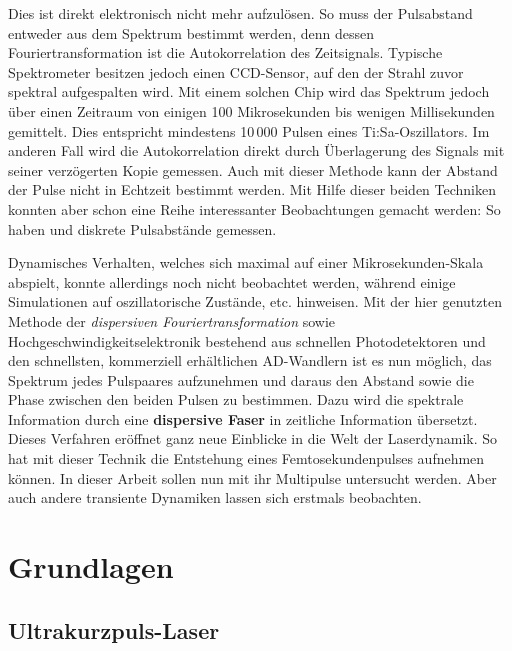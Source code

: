 \documentclass[bachelor,       %
               twoside,        %
               BCOR10mm,       %
               liststotoc,nomtotoc,bibtotoc, %
               english,ngerman, %
               final,          %
               ]{GAUBM}
\begin{document}
Dies ist direkt elektronisch nicht mehr aufzulösen.
So muss der Pulsabstand entweder aus dem Spektrum bestimmt werden, denn dessen Fouriertransformation ist die Autokorrelation des Zeitsignals.
Typische Spektrometer besitzen jedoch einen CCD-Sensor, auf den der Strahl zuvor spektral aufgespalten wird.
Mit einem solchen Chip wird das Spektrum jedoch über einen Zeitraum von einigen 100 Mikrosekunden bis wenigen Millisekunden gemittelt.
Dies entspricht mindestens 10\,000 Pulsen eines Ti:Sa-Oszillators.
Im anderen Fall wird die Autokorrelation direkt durch Überlagerung des Signals mit seiner verzögerten Kopie gemessen.
Auch mit dieser Methode kann der Abstand der Pulse nicht in Echtzeit bestimmt werden.
Mit Hilfe dieser beiden Techniken konnten aber schon eine Reihe interessanter Beobachtungen gemacht werden:
So haben \cite{wang_pulse_1997} und \cite{kitano_stable_1998} diskrete Pulsabstände  gemessen.

Dynamisches Verhalten, welches sich maximal auf einer Mikrosekunden-Skala abspielt, konnte allerdings noch nicht beobachtet werden, während einige Simulationen auf oszillatorische Zustände, etc. hinweisen.
Mit der hier genutzten Methode der \textit{dispersiven Fouriertransformation} sowie Hochgeschwindigkeitselektronik bestehend aus schnellen Photodetektoren und den schnellsten, kommerziell erhältlichen AD-Wandlern ist es nun möglich, das Spektrum jedes Pulspaares aufzunehmen und daraus den Abstand sowie die Phase zwischen den beiden Pulsen zu bestimmen.
Dazu wird die spektrale Information durch eine \textbf{dispersive Faser} in zeitliche Information übersetzt.
Dieses Verfahren eröffnet ganz neue Einblicke in die Welt der Laserdynamik.
So hat \cite{herink_resolving_2016} mit dieser Technik die Entstehung eines Femtosekundenpulses aufnehmen können.
In dieser Arbeit sollen nun mit ihr Multipulse untersucht werden.
Aber auch andere transiente Dynamiken lassen sich erstmals beobachten.

\chapter{Grundlagen}

\section{Ultrakurzpuls-Laser}
\end{document}
